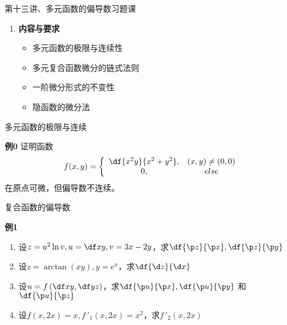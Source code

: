 
\begin{frame}{第十三讲、多元函数的偏导数习题课}
	\linespread{1.5}
	\begin{enumerate}
	  \item {\bf 内容与要求}
	  \begin{itemize}
	    \item 多元函数的极限与连续性
	    \item 多元复合函数微分的链式法则
	    \item 一阶微分形式的不变性
	    \item 隐函数的微分法
	  \vspace{1em}
	  \end{itemize}
	\end{enumerate}
\end{frame}

\begin{frame}{多元函数的极限与连续}
	\linespread{1.5}
	\begin{exampleblock}{{\bf 例0}\hfill}
		  证明函数
		  $$f(x,y)=\left\{\begin{array}{cc}
		  	\df{x^2y}{x^2+y^2},& (x,y)\ne (0,0)\\
		  	0,& else
		  \end{array}\right.$$
		  在原点可微，但偏导数不连续。
	\end{exampleblock}
\end{frame}

\begin{frame}{复合函数的偏导数}
	\linespread{1.5}
	\begin{exampleblock}{{\bf 例1}\hfill}
		\begin{enumerate}
		  \item 设$z=u^2\ln v,u=\df xy,v=3x-2y$，求$\df {\p z}{\p x},\df{\p z}{\p
		  y}$\pause 
		  \item 设$z=\arctan(xy),y=e^x$，求$\df{\d z}{\d x}$\pause 
		  \item 设$u=f\left(\df xy,\df yz\right)$，求$\df {\p u}{\p x},\df {\p u}{\p y}$
		  和$\df {\p u}{\p z}$\pause 
		  \item 设$f(x,2x)=x,f\,'_1(x,2x)=x^2$，求$f\,'_2(x,2x)$
		\end{enumerate}
	\end{exampleblock}
\end{frame}

